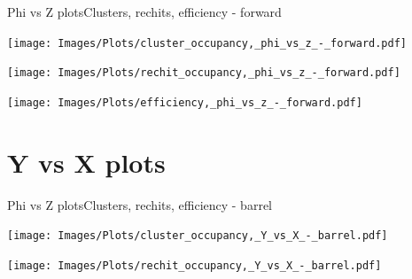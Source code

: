 \documentclass{beamer}
\begin{document}
\begin{frame}{Phi vs Z plots}{Clusters, rechits, efficiency - forward}
  \hspace{0.01\textwidth}%
  \begin{minipage}{0.32\textwidth}
    \centering
    \texttt{[image: Images/Plots/cluster\_occupancy,\_phi\_vs\_z\_-\_forward.pdf]}
  \end{minipage}%
  \hspace{0.01\textwidth}%
  \begin{minipage}{0.32\textwidth}
    \centering
    \texttt{[image: Images/Plots/rechit\_occupancy,\_phi\_vs\_z\_-\_forward.pdf]}
  \end{minipage}
  \vspace*{0.2cm}
  \begin{minipage}{0.32\textwidth}
    \centering
    \texttt{[image: Images/Plots/efficiency,\_phi\_vs\_z\_-\_forward.pdf]}
  \end{minipage}%
\end{frame}

\section{Y vs X plots}

\begin{frame}{Phi vs Z plots}{Clusters, rechits, efficiency - barrel}
  \hspace{0.01\textwidth}%
  \begin{minipage}{0.48\textwidth}
    \centering
    \texttt{[image: Images/Plots/cluster\_occupancy,\_Y\_vs\_X\_-\_barrel.pdf]}
  \end{minipage}%
  \hspace{0.01\textwidth}%
  \begin{minipage}{0.48\textwidth}
    \centering
    \texttt{[image: Images/Plots/rechit\_occupancy,\_Y\_vs\_X\_-\_barrel.pdf]}
  \end{minipage}
\end{frame}
\end{document}
